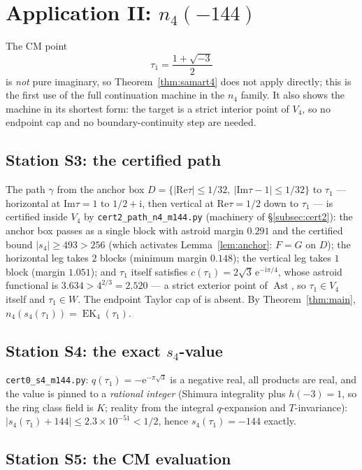 \documentclass[11pt]{article}
\newcommand{\ii}{\mathrm{i}}
\newcommand{\e}{\mathrm{e}}
\newcommand{\ReT}{\mathrm{Re}}
\newcommand{\ImT}{\mathrm{Im}}
\DeclareMathOperator{\EK}{EK}
\DeclareMathOperator{\Ast}{Ast}
\theoremstyle{definition}
\theoremstyle{remark}
\begin{document}
\section{Application II: \texorpdfstring{$n_4(-144)$}{n4(-144)}}
\label{sec:app2}

The CM point
\[
  \tau_1=\frac{1+\sqrt{-3}}2
\]
is \emph{not} pure imaginary, so Theorem~\ref{thm:samart4} does not
apply directly; this is the first use of the full continuation
machine in the $n_4$ family. It also shows the machine in its
shortest form: the target is a strict interior point of $V_4$, so no
endpoint cap and no boundary-continuity step are needed.

\subsection{Station S3: the certified path}

The path $\gamma$ from the anchor box
$D=\{|\ReT\tau|\le1/32,\ |\ImT\tau-1|\le1/32\}$ to $\tau_1$ ---
horizontal at $\ImT\tau=1$ to $1/2+\ii$, then vertical at
$\ReT\tau=1/2$ down to $\tau_1$ --- is certified inside $V_4$ by
\texttt{cert2\_path\_n4\_m144.py} (machinery of
\S\ref{subsec:cert2}): the anchor box passes as a single block with
astroid margin $0.291$ and the certified bound $|s_4|\ge493>256$
(which activates Lemma~\ref{lem:anchor}: $F=G$ on $D$); the
horizontal leg takes $2$ blocks (minimum margin $0.148$); the
vertical leg takes $1$ block (margin $1.051$); and $\tau_1$ itself
satisfies $c(\tau_1)=2\sqrt3\,\e^{-\ii\pi/4}$, whose astroid
functional is $3.634>4^{2/3}=2.520$ --- a strict exterior point of
$\Ast$, so $\tau_1\in V_4$ itself and $\tau_1\in W$. The endpoint
Taylor cap of \cite{Zf} is absent. By Theorem~\ref{thm:main},
$n_4(s_4(\tau_1))=\EK_4(\tau_1)$.

\subsection{Station S4: the exact \texorpdfstring{$s_4$}{s4}-value}

\texttt{cert0\_s4\_m144.py}: $q(\tau_1)=-\e^{-\pi\sqrt3}$ is a
negative real, all products are real, and the value is pinned to a
\emph{rational integer} (Shimura integrality plus $h(-3)=1$, so the
ring class field is $K$; reality from the integral $q$-expansion and
$T$-invariance):
$|s_4(\tau_1)+144|\le2.3\times10^{-51}<1/2$, hence
$s_4(\tau_1)=-144$ exactly.

\subsection{Station S5: the CM evaluation}
\end{document}

